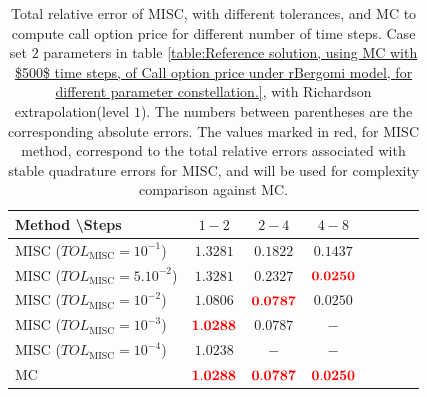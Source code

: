 \begin{table}[h!]
	\centering
	\begin{tabular}{l*{6}{c}r}
		Method \textbackslash  Steps            & $1-2$ & $2-4$ & $4-8$  \\
		\hline
		MISC ($TOL_{\text{MISC}}=10^{-1}$)  & $\mathbf{  1.3281}$ & $\mathbf{0.1822}$ & $\mathbf{0.1437}$   \\
		MISC ($TOL_{\text{MISC}}=5.10^{-2}$)  & $\mathbf{  1.3281}$ & $\mathbf{ 0.2327}$ & $\mathbf{  {\color{red}0.0250}}$   \\
		MISC ($TOL_{\text{MISC}}=10^{-2}$)  & $\mathbf{   1.0806
		}$ & $\mathbf{    {\color{red}0.0787}}$ & $\mathbf{ 0.0250}$  \\
		MISC ($TOL_{\text{MISC}}=10^{-3}$)  & $\mathbf{ {\color{red}  1.0288}}$ & $\mathbf{    0.0787}$ & $\mathbf{-}$  \\
		
		MISC ($TOL_{\text{MISC}}=10^{-4}$)  & $\mathbf{     1.0238}$ & $\mathbf{-}$ & $\mathbf{-}$  \\

		\hline
		
		MC &$\mathbf{ {\color{red}  1.0288}}$  & $\mathbf{{\color{red}0.0787}}$ & $\mathbf{{\color{red}0.0250}}$  \\
		
		\hline
	\end{tabular}
	\caption{Total relative error of MISC, with different tolerances,  and MC to compute call option price  for different number of time steps. Case set $2$ parameters in table \ref{table:Reference solution, using MC with $500$ time steps, of Call option price under rBergomi model, for different parameter constellation.}, with Richardson extrapolation(level $1$). The numbers between parentheses are the corresponding absolute errors. The values marked in red, for MISC method, correspond to the total relative errors associated with  stable quadrature errors for MISC, and will be used for complexity comparison against MC.}
	\label{Total  error of MISC and MC to compute Call option price of the different tolerances for different number of time steps. Case set $2$ parameters, with Richardson extrapolation(level $1$). The numbers between parentheses are the corresponding absolute errors,relative}
\end{table}


